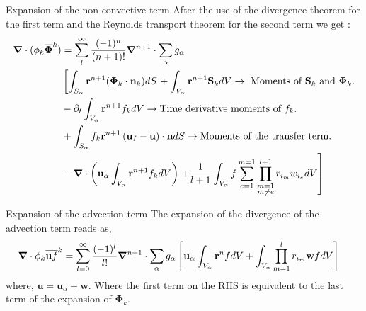 \documentclass{sintefbeamer}
\newcommand{\nablab}{\bm{\nabla}}
\begin{document}
\begin{frame}
  {Expansion of the non-convective term}
  After the use of the divergence theorem for the first term and the Reynolds transport theorem for the second term we get :
  \begin{align*}
    \nablab \cdot
    (\phi_k \kavg{\bm{\Phi}})
    & =\sum_l^\infty
    \frac{(-1)^{n}}{(n+1)!}
    \nablab^{n+1}
    \cdot
    \sum_{\alpha}
    g_{\alpha} \\
  &\left[
    \int_{S_\alpha}
    \textbf{r}^{n+1}
    (\bm{\Phi}_k \cdot \textbf{n}_k) dS
    \right.
      +\int_{V_\alpha}
      \textbf{r}^{n+1}
      \textbf{S}_k dV \rightarrow \text{    Moments of $\textbf{S}_k$ and $\bm{\Phi}_k$.}\\
      &- \pddt
      \int_{V_\alpha}
      \textbf{r}^{n+1}  f_k dV \rightarrow \text{Time derivative moments of $f_k$.}\\
      &
        + \int_{S_\alpha} 
          f_k\textbf{r}^{n+1} 
          \left(\textbf{u}_I - \textbf{u}\right) \cdot \textbf{n}dS
          \rightarrow \text{Moments of the transfer term.}\\
      &- \nablab \cdot\left(
        \textbf{u}_\alpha 
        \int_{V_\alpha}
        \textbf{r}^{n+1}  f_k dV
      \right)
      \left.+\frac{1}{l+1}\int_{V_\alpha}
      f\sum_{e=1}^{m=1} 
      \prod^{l+1}_{\substack{m=1\\ m\neq e}} 
      r_{i_m} 
      w_{i_e}
      dV\right]\\
  \end{align*}
\end{frame}

\begin{frame}
  {Expansion of the advection term}
  The expansion of the divergence of the advection term reads as, 
  \begin{align*}
    \nablab \cdot \phi_k \kavg{\textbf{u} f}
    &= \sum_{l=0}^\infty  
    \frac{(-1)^l}{l!} 
    \nablab^{n+1} \cdot
    \sum_\alpha  g_\alpha 
    \left[
      \textbf{u}_\alpha  \int_{V_\alpha} \textbf{r}^{n} f dV
    + \int_{V_\alpha} \prod^l_{m=1}r_{i_m} \textbf{w} f dV
    \right]
    \label{ap:eq:partial_uf}
\end{align*}
where, $\textbf{u} = \textbf{u}_\alpha + \textbf{w}$.
Where the first term on the RHS is equivalent to the last term of the expansion of $\bm{\Phi}_k$.
\end{frame}
\end{document}
